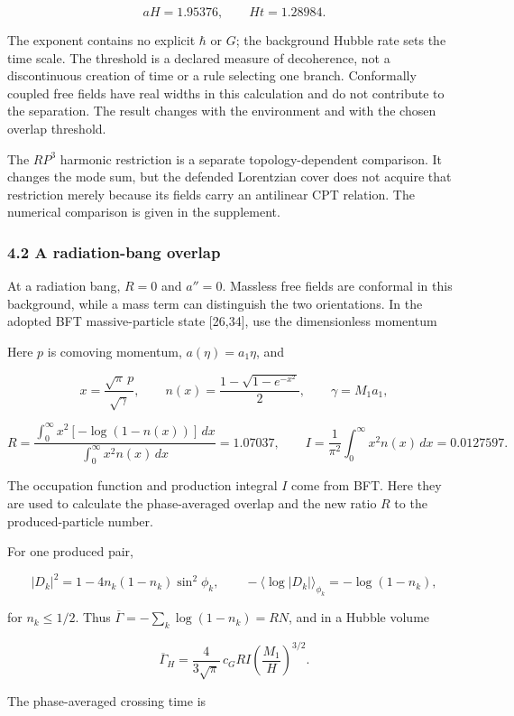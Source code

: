 \documentclass[
]{article}
\begin{document}
\[
aH=1.95376,\qquad Ht=1.28984.
\]

The exponent contains no explicit \(\hbar\) or \(G\); the background
Hubble rate sets the time scale. The threshold is a declared measure of
decoherence, not a discontinuous creation of time or a rule selecting
one branch. Conformally coupled free fields have real widths in this
calculation and do not contribute to the separation. The result changes
with the environment and with the chosen overlap threshold.

The \(RP^3\) harmonic restriction is a separate topology-dependent
comparison. It changes the mode sum, but the defended Lorentzian cover
does not acquire that restriction merely because its fields carry an
antilinear CPT relation. The numerical comparison is given in the
supplement.

\subsubsection{4.2 A radiation-bang
overlap}\label{a-radiation-bang-overlap}

At a radiation bang, \(R=0\) and \(a''=0\). Massless free fields are
conformal in this background, while a mass term can distinguish the two
orientations. In the adopted BFT massive-particle state {[}26,34{]}, use
the dimensionless momentum

Here \(p\) is comoving momentum, \(a(\eta)=a_1\eta\), and

\[
x=\frac{\sqrt{\pi}\,p}{\sqrt{\gamma}},\qquad
n(x)=\frac{1-\sqrt{1-e^{-x^2}}}{2},\qquad \gamma=M_1a_1,
\]

\[
R=\frac{\int_0^\infty x^2[-\log(1-n(x))]\,dx}
        {\int_0^\infty x^2n(x)\,dx}=1.07037,
\qquad
I=\frac{1}{\pi^2}\int_0^\infty x^2n(x)\,dx=0.0127597.
\]

The occupation function and production integral \(I\) come from BFT.
Here they are used to calculate the phase-averaged overlap and the new
ratio \(R\) to the produced-particle number.

For one produced pair,

\[
|D_k|^2=1-4n_k(1-n_k)\sin^2\phi_k,
\qquad
-\langle\log|D_k|\rangle_{\phi_k}=-\log(1-n_k),
\]

for \(n_k\leq1/2\). Thus \(\overline\Gamma=-\sum_k\log(1-n_k)=RN\), and
in a Hubble volume

\[
\overline\Gamma_H=\frac{4}{3\sqrt\pi}\,c_GRI
\left(\frac{M_1}{H}\right)^{3/2}.
\]

The phase-averaged crossing time is
\end{document}
